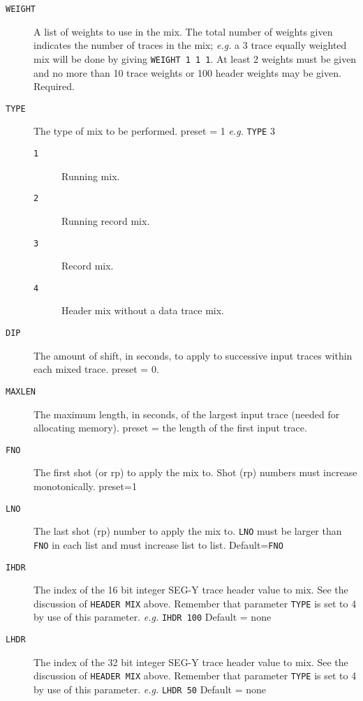 \begin{description}
\item[\texttt{WEIGHT}] A list of weights to use in the mix.  The total number of
         weights given indicates the number of traces in the mix;
         \textit{e.g.} a 3 trace equally weighted mix will be done by giving
         \texttt{WEIGHT 1 1 1}.  At least 2 weights must be given and no more
         than 10 trace weights or 100 header weights may be given.
         Required.

\item[\texttt{TYPE}] The type of mix to be performed.
         \Gls{preset} = 1     \textit{e.g.} \texttt{TYPE} 3
\begin{description}
\item[\texttt{1}] Running mix.
\item[\texttt{2}] Running record mix.
\item[\texttt{3}] Record mix.
\item[\texttt{4}] Header mix without a data trace mix.
\end{description}

\item[\texttt{DIP}] The amount of shift, in seconds, to apply to successive input
         traces within each mixed trace.
         \Gls{preset} = 0.

\item[\texttt{MAXLEN}] The maximum length, in seconds, of the largest input trace
         (needed for allocating memory).
         \Gls{preset} = the length of the first input trace.

\item[\texttt{FNO}] The first \gls{shot} (or \gls{rp}) to apply the mix to.  Shot (\gls{rp}) numbers
         must increase monotonically.
         \Gls{preset}=1

\item[\texttt{LNO}] The last \gls{shot} (\gls{rp}) number to apply the mix to.  \texttt{LNO} must be
         larger than \texttt{FNO} in each list and must increase list to list.
         Default=\texttt{FNO}

\item[\texttt{IHDR}] The index of the 16 bit integer SEG-Y trace header value to mix.
         See the discussion of \texttt{HEADER MIX} above.  Remember that parameter
         \texttt{TYPE} is set to 4 by use of this parameter.
         \textit{e.g.} \texttt{IHDR 100}
         Default = none

\item[\texttt{LHDR}] The index of the 32 bit integer SEG-Y trace header value to mix.
         See the discussion of \texttt{HEADER MIX} above.  Remember that parameter
         \texttt{TYPE} is set to 4 by use of this parameter.
         \textit{e.g.} \texttt{LHDR 50}
         Default = none


\end{description}

